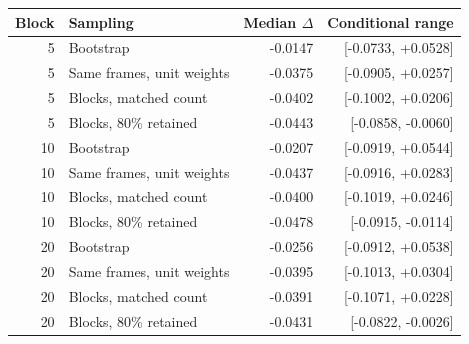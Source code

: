 \begin{tabular}{rlrr}
\toprule
Block & Sampling & Median $\Delta$ & Conditional range \\
\midrule
5 & Bootstrap & -0.0147 & [-0.0733, +0.0528] \\
5 & Same frames, unit weights & -0.0375 & [-0.0905, +0.0257] \\
5 & Blocks, matched count & -0.0402 & [-0.1002, +0.0206] \\
5 & Blocks, 80\% retained & -0.0443 & [-0.0858, -0.0060] \\
10 & Bootstrap & -0.0207 & [-0.0919, +0.0544] \\
10 & Same frames, unit weights & -0.0437 & [-0.0916, +0.0283] \\
10 & Blocks, matched count & -0.0400 & [-0.1019, +0.0246] \\
10 & Blocks, 80\% retained & -0.0478 & [-0.0915, -0.0114] \\
20 & Bootstrap & -0.0256 & [-0.0912, +0.0538] \\
20 & Same frames, unit weights & -0.0395 & [-0.1013, +0.0304] \\
20 & Blocks, matched count & -0.0391 & [-0.1071, +0.0228] \\
20 & Blocks, 80\% retained & -0.0431 & [-0.0822, -0.0026] \\
\bottomrule
\end{tabular}
